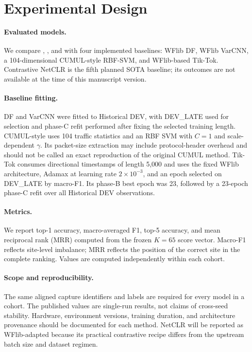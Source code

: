 \section{Experimental Design}\label{sec:experiments}
\paragraph{Evaluated models.} We compare \Micro{}, \Macro{}, and \Hybrid{} with four implemented baselines: WFlib DF, WFlib VarCNN, a 104-dimensional CUMUL-style RBF-SVM, and WFlib-based Tik-Tok. Contrastive NetCLR is the fifth planned SOTA baseline; its outcomes are not available at the time of this manuscript version.

\paragraph{Baseline fitting.} DF and VarCNN were fitted to Historical DEV, with DEV\_LATE used for selection and phase-C refit performed after fixing the selected training length. CUMUL-style uses 104 traffic statistics and an RBF SVM with $C=1$ and scale-dependent $\gamma$. Its packet-size extraction may include protocol-header overhead and should not be called an exact reproduction of the original CUMUL method. Tik-Tok consumes directional timestamps of length 5,000 and uses the fixed WFlib architecture, Adamax at learning rate $2\times10^{-3}$, and an epoch selected on DEV\_LATE by macro-F1. Its phase-B best epoch was 23, followed by a 23-epoch phase-C refit over all Historical DEV observations.

\paragraph{Metrics.} We report top-1 accuracy, macro-averaged F1, top-5 accuracy, and mean reciprocal rank (MRR) computed from the frozen $K=65$ score vector. Macro-F1 reflects site-level imbalance; MRR reflects the position of the correct site in the complete ranking. Values are computed independently within each cohort.

\paragraph{Scope and reproducibility.} The same aligned capture identifiers and labels are required for every model in a cohort. The published values are single-run results, not claims of cross-seed stability. Hardware, environment versions, training duration, and architecture provenance should be documented for each method. NetCLR will be reported as WFlib-adapted because its practical contrastive recipe differs from the upstream batch size and dataset regimen.
